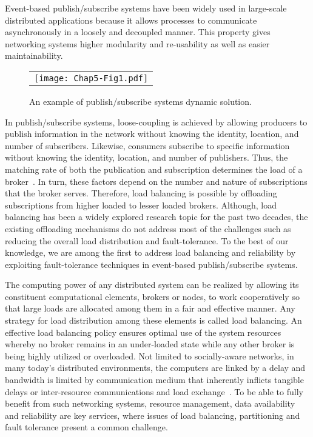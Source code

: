 Event-based publish/subscribe systems have been widely used in large-scale distributed applications because it allows processes to communicate asynchronously in a loosely and decoupled manner. This property gives networking systems higher modularity and re-usability as well as easier maintainability.
\begin{figure}[h]
\begin{center}
  \begin{tabular}{c}
  \texttt{[image: Chap5-Fig1.pdf]}
  \end{tabular}
  \caption{An example of publish/subscribe systems dynamic solution.}
\end{center}
\end{figure}
In publish/subscribe systems, loose-coupling is achieved by allowing producers to publish information in the network without knowing the identity, location, and number of subscribers. Likewise, consumers subscribe to specific information without knowing the identity, location, and number of publishers. Thus, the matching rate of both the publication and subscription determines the load of a broker~\cite{AKYCheung2010}. In turn, these factors depend on the number and nature of subscriptions that the broker serves. Therefore, load balancing is possible by offloading subscriptions from higher loaded to lesser loaded brokers. Although, load balancing has been a widely explored research topic for the past two decades, the existing offloading mechanisms do not address most of the challenges such as reducing the overall load distribution and fault-tolerance.  To the best of our knowledge, we are among the first to address load balancing and reliability by exploiting fault-tolerance techniques in event-based publish/subscribe systems.

The computing power of any distributed system can be realized by allowing its constituent computational elements, brokers or nodes, to work cooperatively so that large loads are allocated among them in a fair and effective manner. Any strategy for load distribution among these elements is called load balancing. An effective load balancing policy ensures optimal use of the system resources whereby no broker remains in an under-loaded state while any other broker is being highly utilized or overloaded. Not limited to socially-aware networks, in many today's distributed environments, the computers are linked by a delay and bandwidth is limited by communication medium that inherently inflicts tangible delays or inter-resource communications and load exchange~\cite{SDhakal2007}. To be able to fully benefit from such networking systems, resource management, data availability and reliability are key services, where issues of load balancing, partitioning and fault tolerance present a common challenge.


